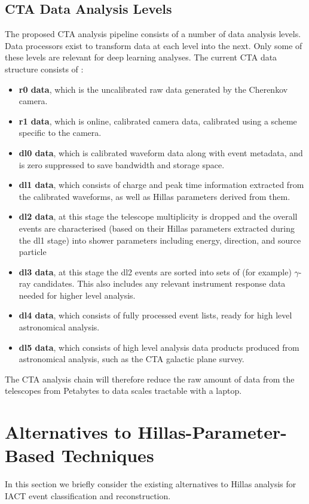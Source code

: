 \subsection{CTA Data Analysis Levels}

The proposed CTA analysis pipeline consists of a number of data analysis levels. Data processors exist to transform data at each level into the next. Only some of these levels are relevant for deep learning analyses. The current CTA data structure consists of \cite{jasonthesis}:
\begin{itemize}
    \item \textbf{r0 data}, which is the uncalibrated raw data generated by the Cherenkov camera.
    \item \textbf{r1 data}, which is online, calibrated camera data, calibrated using a scheme specific to the camera.
    \item \textbf{dl0 data}, which is calibrated waveform data along with event metadata, and is zero suppressed to save bandwidth and storage space.
    \item \textbf{dl1 data}, which consists of charge and peak time information extracted from the calibrated waveforms, as well as Hillas parameters derived from them.
    \item \textbf{dl2 data}, at this stage the telescope multiplicity is dropped and the overall events are characterised (based on their Hillas parameters extracted during the dl1 stage) into shower parameters including energy, direction, and source particle
    \item \textbf{dl3 data}, at this stage the dl2 events are sorted into sets of (for example) $\gamma$-ray candidates. This also includes any relevant instrument response data needed for higher level analysis.
    \item \textbf{dl4 data}, which consists of fully processed event lists, ready for high level astronomical analysis.
    \item \textbf{dl5 data}, which consists of high level analysis data products produced from astronomical analysis, such as the CTA galactic plane survey.
\end{itemize}

The CTA analysis chain will therefore reduce the raw amount of data from the telescopes from Petabytes to data scales tractable with a laptop.

\section{Alternatives to Hillas-Parameter-Based Techniques}
In this section we briefly consider the existing alternatives to Hillas analysis for IACT event classification and reconstruction.
